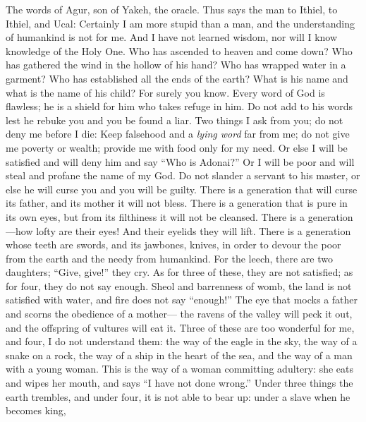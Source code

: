 \begin{biblechapter} %
 The words of Agur, son of Yakeh, the oracle. 
Thus says the man to Ithiel, to Ithiel, and Ucal:
\verse Certainly I am more stupid than a man, 
and the understanding of humankind is not for me.
\verse And I have not learned wisdom, 
nor will I know knowledge of the Holy One.
\verse Who has ascended to heaven and come down? 
Who has gathered the wind in the hollow of his hand? 
Who has wrapped water in a garment? 
Who has established all the ends of the earth? 
What is his name and what is the name of his child? 
For surely you know.
\verse Every word of God is flawless; 
he is a shield for him who takes refuge in him.
\verse Do not add to his words 
lest he rebuke you and you be found a liar.
\verse Two things I ask from you; 
do not deny me before I die:
\verse Keep falsehood and a \textit{lying word} far from me; 
do not give me poverty or wealth; 
provide me with food only for my need.
\verse Or else I will be satisfied and will deny him 
and say “Who is Adonai?” 
Or I will be poor and will steal 
and profane the name of my God.
\verse Do not slander a servant to his master, 
or else he will curse you and you will be guilty.
\verse There is a generation that will curse its father, 
and its mother it will not bless.
\verse There is a generation that is pure in its own eyes, 
but from its filthiness it will not be cleansed.
\verse There is a generation—how lofty are their eyes! 
And their eyelids they will lift.
\verse There is a generation whose teeth are swords, 
and its jawbones, knives, 
in order to devour the poor from the earth 
and the needy from humankind.
\verse For the leech, there are two daughters; 
“Give, give!” they cry. 
As for three of these, they are not satisfied; 
as for four, they do not say enough.
\verse Sheol and barrenness of womb, 
the land is not satisfied with water, 
and fire does not say “enough!”
\verse The eye that mocks a father 
and scorns the obedience of a mother— 
the ravens of the valley will peck it out, 
and the offspring of vultures will eat it.
\verse Three of these are too wonderful for me, 
and four, I do not understand them:
\verse the way of the eagle in the sky, 
the way of a snake on a rock, 
the way of a ship in the heart of the sea, 
and the way of a man with a young woman.
\verse This is the way of a woman committing adultery: 
she eats and wipes her mouth, 
and says “I have not done wrong.”
\verse Under three things the earth trembles, 
and under four, it is not able to bear up:
\verse under a slave when he becomes king, 

\end{biblechapter}
